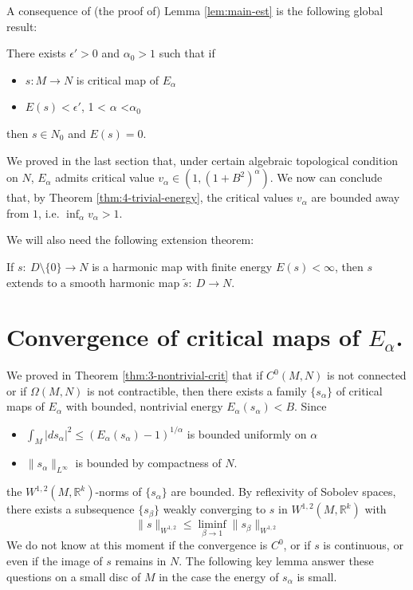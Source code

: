 A consequence of (the proof of) Lemma \ref{lem:main-est} is the following global result:

\begin{theorem}
\label{thm:4-trivial-energy}
There exists \(\epsilon' >0\) and \(\alpha_0 > 1\)  such that if
\begin{itemize}
\item \(s: M \longrightarrow N\) is critical map of \(E_\alpha\)
\item \(E(s)<\epsilon'\), 1 < \(\alpha\) <\(\alpha_{\text{0}}\)
\end{itemize}
then \(s\in N_0\) and \(E(s) = 0\).
\end{theorem}

We proved in the last section that, under certain algebraic topological condition on \(N\), \(E_\alpha\) admits critical value \(v_\alpha \in (1, (1+B^2)^\alpha)\). We now
can conclude that, by Theorem \ref{thm:4-trivial-energy}, the critical values \(v_\alpha\)
are bounded away from \(1\), i.e. \(\inf_{\alpha} v_\alpha > 1\).


We will also need the following extension theorem:

\begin{theorem}
\label{thm:extension-sacks-uhlenbeck}
If \(s:\ D\setminus \{0\} \longrightarrow N\) is a harmonic map with finite energy \(E(s) < \infty\), then \(s\) extends to a smooth harmonic map \(\tilde s:\ D \longrightarrow N\).
\end{theorem}



\section{Convergence of critical maps of \(E_{\alpha}\).}
\label{sec:org9deaeda}

We proved in Theorem \ref{thm:3-nontrivial-crit} that if \(C^0(M,N)\) is not connected or
if \(\Omega(M,N)\) is not contractible, then there exists a family \(\{s_\alpha\}\) of
critical maps  of \(E_\alpha\) with bounded, nontrivial energy \(E_\alpha(s_\alpha) < B\). Since 
\begin{itemize}
\item \(\int_M |ds_\alpha|^2 \leq \left(E_\alpha(s_\alpha)-1\right)^{1/\alpha}\) is bounded
uniformly on \(\alpha\)
\item \(\|s_\alpha\|_{L^\infty}\) is bounded by compactness of \(N\).
\end{itemize}
the \(W^{1,2}(M, \mathbb{R}^k)\)-norms of \(\{s_\alpha\}\) are bounded. By
reflexivity of Sobolev spaces, there exists a subsequence \(\{s_\beta\}\) weakly
converging to \(s\) in \(W^{1,2}(M,\mathbb{R}^k)\) with
\[
\|s\|_{W^{1,2}}\leq \liminf_{\beta\to 1} \|s_\beta\|_{W^{1,2}}
\]
We do not know at this moment if the convergence is \(C^0\), or if \(s\) is
continuous, or even if the image of \(s\) remains in \(N\). The following key lemma
answer these questions on a small disc of \(M\) in the case the energy of \(s_\alpha\)
is small.

